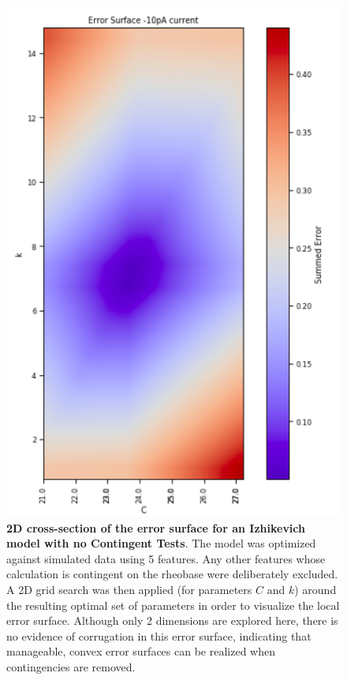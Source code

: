 \begin{figure}
    \centering
    \includegraphics[scale=0.7]{figures/friendly_error_surface.png}
    \caption[Constant Currents Produce Tractable Error Surfaces]{\textbf{2D cross-section of the error surface for an Izhikevich model with no Contingent Tests}.
    The model was optimized against simulated data using 5 features.
    Any other features whose calculation is contingent on the rheobase were deliberately excluded.
    A 2D grid search was then applied (for parameters $C$ and $k$) around the resulting optimal set of parameters in order to visualize the local error surface.
    Although only 2 dimensions are explored here, there is no evidence of corrugation in this error surface, indicating that manageable, convex error surfaces can be realized when contingencies are removed.}
    \label{fig:constant_current}
\end{figure}

